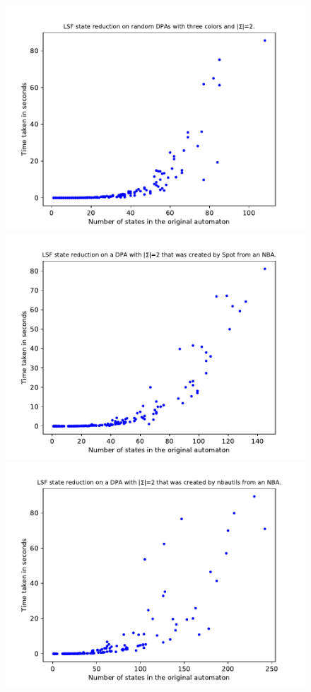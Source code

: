 \begin{figure}
	\centering
	\begin{minipage}{0.49\textwidth}
		\includegraphics[page=4,height=.3\textheight]{../data/analysis/lsf/gendet_ap1.pdf} 
		\includegraphics[page=4,height=.3\textheight]{../data/analysis/lsf/detspot_ap1.pdf} 
		\includegraphics[page=4,height=.3\textheight]{../data/analysis/lsf/detnbaut_ap1.pdf} 

\end{minipage}
\end{figure}
